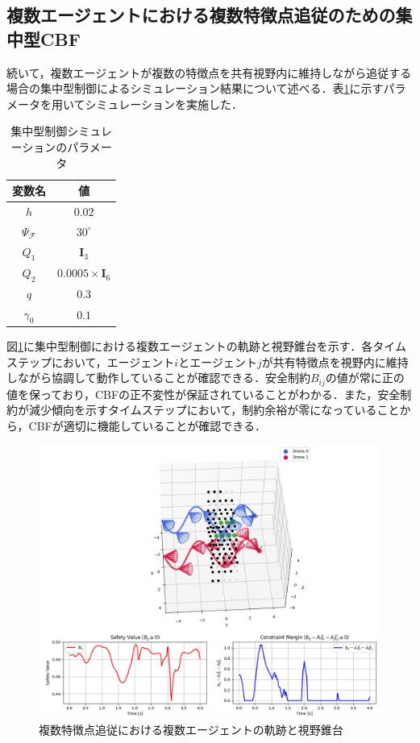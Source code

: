 \subsection{複数エージェントにおける複数特徴点追従のための集中型CBF}

続いて，複数エージェントが複数の特徴点を共有視野内に維持しながら追従する場合の集中型制御によるシミュレーション結果について述べる．表\ref{tab:centralized_params}に示すパラメータを用いてシミュレーションを実施した．

\begin{table}[htbp]
\centering
\caption{集中型制御シミュレーションのパラメータ}
\label{tab:centralized_params}
\begin{tabular}{cc}
\hline
変数名 & 値 \\
\hline
$h$ & $0.02$ \\
$\Psi_{\mathcal{F}}$ & $30^{\circ}$ \\
$Q_1$ & $\mathbf{I}_3$ \\
$Q_2$ & $0.0005\times\mathbf{I}_6$ \\
$q$ & $0.3$ \\
$\gamma_0$ & $0.1$ \\
\hline
\end{tabular}
\end{table}

図\ref{fig:centralized_trajectory}に集中型制御における複数エージェントの軌跡と視野錐台を示す．各タイムステップにおいて，エージェント$i$とエージェント$j$が共有特徴点を視野内に維持しながら協調して動作していることが確認できる．安全制約$B_{ij}$の値が常に正の値を保っており，CBFの正不変性が保証されていることがわかる．また，安全制約が減少傾向を示すタイムステップにおいて，制約余裕が零になっていることから，CBFが適切に機能していることが確認できる．

\begin{figure}[htbp]
\centering
\includegraphics[width=0.6\linewidth]{fig/pcl_multi_centric.png}
\caption{複数特徴点追従における複数エージェントの軌跡と視野錐台}
\label{fig:centralized_trajectory}
\end{figure}

